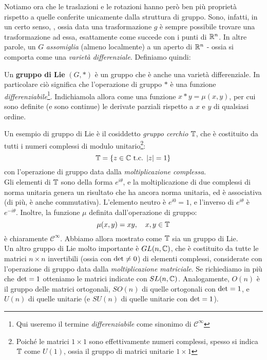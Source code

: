 \documentclass[../../FisicaTeorica.tex]{subfiles}
\begin{document}
Notiamo ora che le traslazioni e le rotazioni hanno però ben più proprietà rispetto a quelle conferite unicamente dalla struttura di gruppo. Sono, infatti, in un certo senso, , ossia data una trasformazione $g$ è sempre possibile trovare una trasformazione  ad essa, esattamente come succede con i punti di $\mathbb{R}^n$. In altre parole, un $G$  \textit{assomiglia} (almeno localmente) a un aperto di $\mathbb{R}^n$ - ossia si comporta come una \textit{varietà differenziale}. Definiamo quindi:

\begin{dfn}
Un \textbf{gruppo di Lie} $(G,*)$ è un gruppo che è anche una varietà differenziale. In particolare ciò significa che l'operazione di gruppo $*$ è una funzione \textit{differenziabile}\footnote{Qui useremo il termine \textit{differenziabile} come sinonimo di $\mathcal{C}^\infty$}. Indichiamola allora come una funzione $x * y = \mu(x,y)$, per cui sono definite (e sono continue) le derivate parziali rispetto a $x$ e $y$ di qualsiasi ordine.
\end{dfn}

Un esempio di gruppo di Lie è il cosiddetto \textit{gruppo cerchio} $\mathbb{T}$, che è costituito da tutti i numeri complessi di modulo unitario\footnote{Poiché le matrici $1\times 1$ sono effettivamente numeri complessi, spesso si indica $\mathbb{T}$ come $U(1)$, ossia il gruppo di matrici unitarie $1 \times 1$}:
\[
\mathbb{T}=\{z \in \mathbb{C} \text{ t.c. } |z| = 1\}
\]
con l'operazione di gruppo data dalla \textit{moltiplicazione complessa}.\\
Gli elementi di $\mathbb{T}$ sono della forma $e^{i\theta}$, e la moltiplicazione di due complessi di norma unitaria genera un risultato che ha ancora norma unitaria, ed  è associativa (di più, è anche commutativa). L'elemento neutro è $e^{i0} = 1$, e l'inverso di $e^{i\theta}$ è $e^{-i\theta}$. Inoltre, la funzione $\mu$ definita dall'operazione di gruppo:
\[
\mu(x,y)=x y, \quad x,y \in \mathbb{T}
\]
è chiaramente $\mathcal{C}^\infty$. Abbiamo allora mostrato come $\mathbb{T}$ sia un gruppo di Lie.\\

Un altro gruppo di Lie molto importante è $GL(n,\mathbb{C})$, che è costituito da tutte le matrici $n\times n$ invertibili (ossia con $\operatorname{det}\neq 0$) di elementi complessi, considerate con l'operazione di gruppo data dalla \textit{moltiplicazione matriciale}. Se richiediamo in più che $\operatorname{det}=1$ otteniamo le matrici  indicate con $SL(n,\mathbb{C})$. Analogamente, $O(n)$ è il gruppo delle matrici ortogonali, $SO(n)$ di quelle ortogonali con $\operatorname{det}=1$, e $U(n)$ di quelle unitarie (e $SU(n)$ di quelle unitarie con $\operatorname{det}=1$).\\
\end{document}

